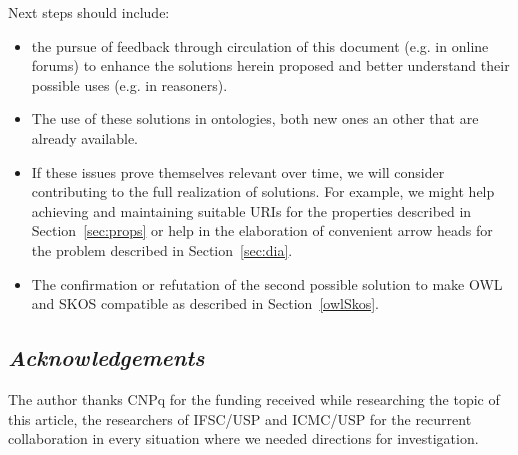 \documentclass[12pt,fleqn]{article}
\begin{document}
Next steps should include:
\begin{itemize}
	\item the pursue of feedback through circulation of this document (e.g. in online forums)
		to enhance the solutions herein proposed and better understand their possible uses (e.g. in reasoners).
	\item The use of these solutions in ontologies, both new ones an other that are already available.
	\item If these issues prove themselves relevant over time, we will consider contributing to the full realization of solutions.
		For example, we might help achieving and maintaining suitable URIs for the properties described in Section~\ref{sec:props}
		or help in the elaboration of convenient arrow heads for the problem described in Section~\ref{sec:dia}.
	\item The confirmation or refutation of the second possible solution to make OWL and SKOS compatible as described in Section~\ref{owlSkos}.
\end{itemize}




\subsection*{\textit{Acknowledgements}}
The author thanks CNPq for the funding received while researching the topic of this article,
the researchers of IFSC/USP and ICMC/USP for the recurrent collaboration in every situation
where we needed directions for investigation.
\end{document}
